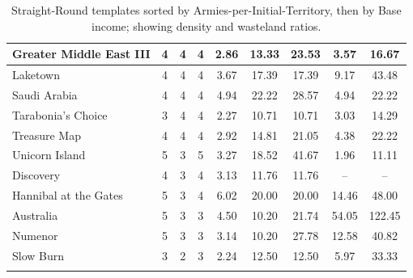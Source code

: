 \begin{longtable}{|l|c|c|c|c|c|c|c|c|}
Greater Middle East III   & 4 & 4 & 4 & 2.86 & 13.33 & 23.53 & 3.57 & 16.67 \\ \hline
Laketown                  & 4 & 4 & 4 & 3.67 & 17.39 & 17.39 & 9.17 & 43.48 \\ \hline
Saudi Arabia              & 4 & 4 & 4 & 4.94 & 22.22 & 28.57 & 4.94 & 22.22 \\ \hline
Tarabonia's Choice        & 3 & 4 & 4 & 2.27 & 10.71 & 10.71 & 3.03 & 14.29 \\ \hline
Treasure Map              & 4 & 4 & 4 & 2.92 & 14.81 & 21.05 & 4.38 & 22.22 \\ \hline\hline\hline
Unicorn Island            & 5 & 3 & 5 & 3.27 & 18.52 & 41.67 & 1.96 & 11.11 \\ \hline
Discovery                 & 4 & 3 & 4 & 3.13 & 11.76 & 11.76 & --   & --   \\ \hline
Hannibal at the Gates     & 5 & 3 & 4 & 6.02 & 20.00 & 20.00 & 14.46 & 48.00 \\ \hline
Australia                 & 5 & 3 & 3 & 4.50 & 10.20 & 21.74 & 54.05 & 122.45 \\ \hline
Numenor                   & 5 & 3 & 3 & 3.14 & 10.20 & 27.78 & 12.58 & 40.82 \\ \hline\hline\hline
Slow Burn                 & 3 & 2 & 3 & 2.24 & 12.50 & 12.50 & 5.97 & 33.33 \\ \hline
\caption{Straight-Round templates sorted by Armies-per-Initial-Territory, then by Base income; showing density and wasteland ratios.}
\label{table:sr_ratios_sorted}
\end{longtable}
\normalsize

